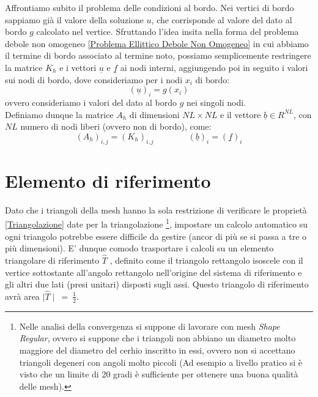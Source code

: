 \documentclass[12pt,a4paper]{report}
\theoremstyle{theorem}
\theoremstyle{theorem}
\theoremstyle{definition}
\begin{document}
Affrontiamo subito il problema delle condizioni al bordo. Nei vertici di bordo sappiamo già il valore della soluzione $u$, che corrisponde al valore del dato al bordo $g$ calcolato nel vertice. Sfruttando l'idea insita nella forma del problema debole non omogeneo \ref{Problema Ellittico Debole Non Omogeneo} in cui abbiamo il termine di bordo associato al termine noto, possiamo semplicemente restringere la matrice $K_{h}$ e i vettori $\underline{u}$ e $\underline{f}$ ai nodi interni, aggiungendo poi in seguito i valori sui nodi di bordo, dove consideriamo per i nodi $x_{i}$ di bordo:
\[ (\underline{u})_{i} = g(x_{i}) \]
ovvero consideriamo i valori del dato al bordo $g$ nei singoli nodi.\\
Definiamo dunque la matrice $A_{h}$ di dimensioni $NL \times NL$ e il vettore $\underline{b} \in R^{NL}$, con $NL$ numero di nodi liberi (ovvero non di bordo), come:
\[ (A_{h})_{i,j} = (K_{h})_{i,j} \qquad \qquad (\underline{b})_{i} = (\underline{f})_{i}\]

\section{Elemento di riferimento}
Dato che i triangoli della mesh hanno la sola restrizione di verificare le proprietà \ref{Triangolazione} date per la triangolazione \footnote{Nelle analisi della convergenza si suppone di lavorare con mesh \emph{Shape Regular}, ovvero si suppone che i triangoli non abbiano un diametro molto maggiore del diametro del cerhio inscritto in essi, ovvero non si accettano triangoli degeneri con angoli molto piccoli (Ad esempio a livello pratico si è visto che un limite di 20 gradi è sufficiente per ottenere una buona qualità delle mesh).}, impostare un calcolo automatico su ogni triangolo potrebbe essere difficile da gestire (ancor di più se si passa a tre o più dimensioni). E' dunque comodo trasportare i calcoli su un elemento triangolare di riferimento $\hat{T}$ , definito come il triangolo rettangolo isoscele con il vertice sottostante all'angolo rettangolo nell'origine del sistema di riferimento e gli altri due lati (presi unitari) disposti sugli assi. Questo triangolo di riferimento avrà area $\mid \hat{T} \mid \ = \ \frac{1}{2}$.
\end{document}
